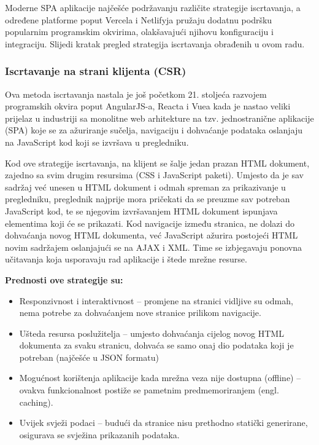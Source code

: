 \bigskip

Moderne SPA aplikacije najčešće  podržavanju različite strategije iscrtavanja, a određene platforme poput Vercela i
Netlifyja pružaju dodatnu podršku popularnim programskim okvirima, olakšavajući njihovu konfiguraciju i integraciju. Slijedi kratak pregled strategija iscrtavanja obrađenih u ovom radu.

\subsubsection{Iscrtavanje na strani klijenta (CSR)}

Ova metoda iscrtavanja nastala je još početkom 21. stoljeća razvojem programskih okvira poput AngularJS-a, Reacta i Vuea kada je nastao veliki prijelaz u industriji sa monolitne web arhitekture na tzv. jednostranične aplikacije (SPA) koje se za ažuriranje sučelja, navigaciju i dohvaćanje podataka oslanjaju na JavaScript kod koji se izvršava u pregledniku.

\bigskip

Kod ove strategije iscrtavanja, na klijent se šalje jedan prazan HTML dokument, zajedno sa svim drugim resursima (CSS i JavaScript paketi). Umjesto da je sav sadržaj već unesen u HTML dokument i odmah spreman za prikazivanje u pregledniku, preglednik najprije mora pričekati da se preuzme sav potreban JavaScript kod, te se njegovim izvršavanjem HTML dokument ispunjava elementima koji će se prikazati. Kod navigacije između stranica, ne dolazi do dohvaćanja novog HTML dokumenta, već JavaScript ažurira postojeći HTML novim sadržajem oslanjajući se na AJAX i XML. Time se izbjegavaju ponovna učitavanja koja usporavaju rad aplikacije i štede mrežne resurse. \cite{beran2023usporedba}

\bigskip

\textbf{Prednosti ove strategije su:}

\begin{itemize}
    \item Responzivnost i interaktivnost – promjene na stranici vidljive su odmah, nema potrebe za dohvaćanjem nove stranice prilikom navigacije.
    \item Ušteda resursa poslužitelja – umjesto dohvaćanja cijelog novog HTML dokumenta za svaku stranicu, dohvaća se samo onaj dio podataka koji je potreban (najčešće u JSON formatu)
    \item Mogućnost korištenja aplikacije kada mrežna veza nije dostupna (offline) – ovakva funkcionalnost postiže se pametnim predmemoriranjem (engl. caching).
    \item Uvijek svježi podaci – budući da stranice nisu prethodno statički generirane, osigurava se svježina prikazanih podataka.
\end{itemize}


